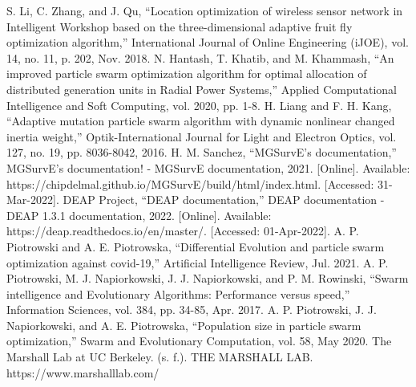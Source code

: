 \documentclass[letterpaper]{report}
\begin{document}
\begin{thebibliography}{99}
  S. Li, C. Zhang, and J. Qu, “Location optimization of wireless sensor network in Intelligent Workshop based on the three-dimensional adaptive fruit fly optimization algorithm,” International Journal of Online Engineering (iJOE), vol. 14, no. 11, p. 202, Nov. 2018. 
  N. Hantash, T. Khatib, and M. Khammash, “An improved particle swarm optimization algorithm for optimal allocation of distributed generation units in Radial Power Systems,” Applied Computational Intelligence and Soft Computing, vol. 2020, pp. 1-8.
  H. Liang and F. H. Kang, “Adaptive mutation particle swarm algorithm with dynamic nonlinear changed inertia weight,” Optik-International Journal for Light and Electron Optics, vol. 127, no. 19, pp. 8036-8042, 2016.
  H. M. Sanchez, “MGSurvE's documentation,” MGSurvE's documentation! - MGSurvE documentation, 2021. [Online]. Available: https://chipdelmal.github.io/MGSurvE/build/html/index.html. [Accessed: 31-Mar-2022]. 
  DEAP Project, “DEAP documentation,” DEAP documentation - DEAP 1.3.1 documentation, 2022. [Online]. Available: https://deap.readthedocs.io/en/master/. [Accessed: 01-Apr-2022]. 
  A. P. Piotrowski and A. E. Piotrowska, “Differential Evolution and particle swarm optimization against covid-19,” Artificial Intelligence Review, Jul. 2021. 
  A. P. Piotrowski, M. J. Napiorkowski, J. J. Napiorkowski, and P. M. Rowinski, “Swarm intelligence and Evolutionary Algorithms: Performance versus speed,” Information Sciences, vol. 384, pp. 34-85, Apr. 2017. 
  A. P. Piotrowski, J. J. Napiorkowski, and A. E. Piotrowska, “Population size in particle swarm optimization,” Swarm and Evolutionary Computation, vol. 58, May 2020. 
  The Marshall Lab at UC Berkeley. (s. f.). THE MARSHALL LAB. https://www.marshalllab.com/
\end{thebibliography}
\end{document}

